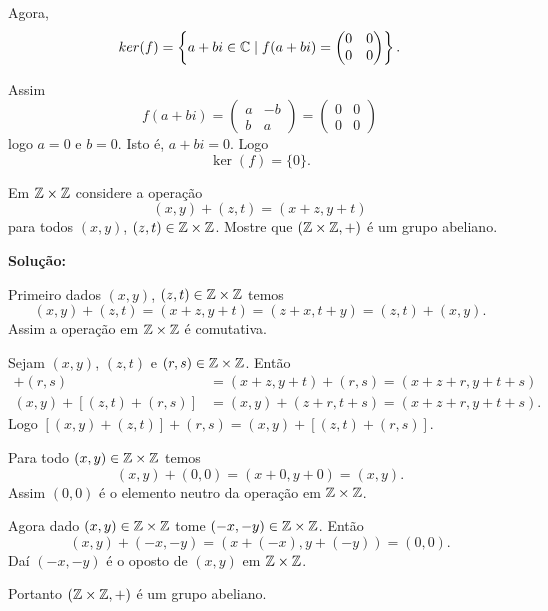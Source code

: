 \documentclass[12pt]{article}
\begin{document}
Agora,
\[
	ker(f) = \left\{a + bi \in \mathbb{C} \mid f(a + bi) = \begin{pmatrix}
		0 & 0\\
		0 & 0
	\end{pmatrix}\right\}.
\]

Assim
\[
	f(a + bi) = \begin{pmatrix}
		a & -b\\
		b & a
	\end{pmatrix} = \begin{pmatrix}
		0 & 0\\
		0 & 0
	\end{pmatrix}
\]
logo $a = 0$ e $b = 0$. Isto é, $a + bi = 0$. Logo 
\[
	\ker(f) = \{0\}.
\]

\vspace{1cm}

\questao Em $\mathbb{Z} \times\mathbb{Z}$ considere a operação
\[
	(x, y) + (z, t) = (x + z, y + t)
\]
para todos $(x,y)$, $(z,t) \in \mathbb{Z}\times\mathbb{Z}$. Mostre que $(\mathbb{Z}\times\mathbb{Z}, +)$ é um grupo abeliano.

\noindent\textbf{Solu\c{c}\~ao:}

Primeiro dados $(x,y)$, $(z,t) \in \mathbb{Z}\times\mathbb{Z}$ temos
\[
	(x,y) + (z,t) = (x+z,y+t) = (z+x,t+y) = (z,t) + (x,y).
\]
Assim a operação em $\mathbb{Z}\times\mathbb{Z}$ é comutativa.

Sejam $(x,y)$, $(z,t)$ e $(r,s) \in \mathbb{Z}\times\mathbb{Z}$. Então
\begin{align*}
	[(x,y) + (z,t)] + (r,s) &= (x + z, y+t) + (r,s) = (x+z+r,y+t+s)\\
	(x,y) + [(z,t)+(r,s)] &= (x,y) + (z+r,t+s) = (x+z+r,y+t+s).
\end{align*}
Logo $[(x,y)+(z,t)] + (r,s) = (x,y) + [(z,t) + (r,s)]$.

Para todo $(x,y) \in \mathbb{Z}\times\mathbb{Z}$ temos
\[
	(x,y) + (0,0) = (x+0,y+0) = (x,y).
\]
Assim $(0,0)$ é o elemento neutro da operação em $\mathbb{Z}\times\mathbb{Z}$.

Agora dado $(x,y) \in \mathbb{Z}\times\mathbb{Z}$ tome $(-x,-y) \in \mathbb{Z}\times\mathbb{Z}$. Então
\[
	(x,y) + (-x,-y) = (x+(-x),y+(-y)) = (0,0).
\]
Daí $(-x,-y)$ é o oposto de $(x,y)$ em $\mathbb{Z}\times\mathbb{Z}$.

Portanto $(\mathbb{Z}\times\mathbb{Z},+)$ é um grupo abeliano.
\end{document}
